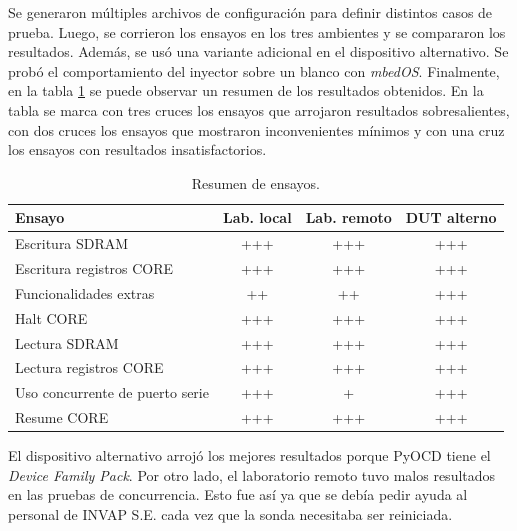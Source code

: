 Se generaron múltiples archivos de configuración para definir distintos casos de prueba.
Luego, se corrieron los ensayos en los tres ambientes y se compararon los resultados.
Además, se usó una variante adicional en el dispositivo alternativo.
Se probó el comportamiento del inyector sobre un blanco con \emph{mbedOS}.
Finalmente, en la tabla \ref{tab:resensayos} se puede observar un resumen de los resultados obtenidos.
En la tabla se marca con tres cruces los ensayos que arrojaron resultados sobresalientes, con dos cruces los ensayos que mostraron inconvenientes mínimos y con una cruz los ensayos con resultados insatisfactorios.

\begin{table}[h]
	\centering
	\caption[Resumen de ensayos]{Resumen de ensayos.}

	\begin{tabular}{l c c c}    
		\toprule
        \textbf{Ensayo}                 & \textbf{Lab. local} & \textbf{Lab. remoto} & \textbf{DUT alterno} \\
		\midrule
		Escritura SDRAM                 & +++                 & +++                  & +++ \\
		Escritura registros CORE        & +++                 & +++                  & +++ \\
		Funcionalidades extras          & ++                  & ++                   & +++ \\
		Halt CORE                       & +++                 & +++                  & +++ \\
		Lectura SDRAM                   & +++                 & +++                  & +++ \\
		Lectura registros CORE          & +++                 & +++                  & +++ \\		
		Uso concurrente de puerto serie & +++                 & +                    & +++ \\
        Resume CORE                     & +++                 & +++                  & +++ \\
		\bottomrule
		\hline
	\end{tabular}
	\label{tab:resensayos}
\end{table}

El dispositivo alternativo arrojó los mejores resultados porque PyOCD tiene el \emph{Device Family Pack}.
Por otro lado, el laboratorio remoto tuvo malos resultados en las pruebas de concurrencia.
Esto fue así ya que se debía pedir ayuda al personal de INVAP S.E. cada vez que la sonda necesitaba ser reiniciada. 

